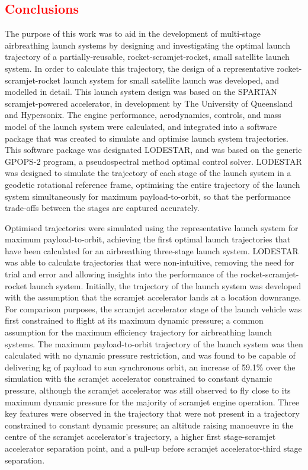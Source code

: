 
\cleardoublepage
\textcolor{red}{
\chapter{Conclusions}
}
\noindent
The purpose of this work was to aid in the development of multi-stage airbreathing launch systems by designing and investigating the optimal launch trajectory of a partially-reusable, rocket-scramjet-rocket, small satellite launch system. 
In order to calculate this trajectory, the design of a representative rocket-scramjet-rocket launch system for small satellite launch was developed, and modelled in detail. This launch system design was based on the SPARTAN scramjet-powered accelerator, in development by The University of Queensland and Hypersonix. The engine performance, aerodynamics, controls, and mass model of the launch system were calculated, and integrated into a software package that was created to simulate and optimise launch system trajectories. This software package was designated LODESTAR, and was based on the generic GPOPS-2 program, a pseudospectral method optimal control solver. LODESTAR was designed to simulate the trajectory of each stage of the launch system in a geodetic rotational reference frame, optimising the entire trajectory of the launch system simultaneously for maximum payload-to-orbit, so that the performance trade-offs between the stages are captured accurately.

Optimised trajectories were simulated using the representative launch system for maximum payload-to-orbit, achieving the first optimal launch trajectories that have been calculated for an airbreathing three-stage launch system. LODESTAR was able to calculate trajectories that were non-intuitive, removing the need for trial and error and allowing insights into the performance of the rocket-scramjet-rocket launch system. 
Initially, the trajectory of the launch system was developed with the assumption that the scramjet accelerator lands at a location downrange.
For comparison purposes, the scramjet accelerator stage of the launch vehicle was first constrained to flight at its maximum dynamic pressure;  a common assumption for the maximum efficiency trajectory for airbreathing launch systems.
The maximum payload-to-orbit trajectory of the launch system was then calculated with no dynamic pressure restriction, and was found to be capable of delivering \PayloadToOrbitStandardNoReturn kg of payload to sun synchronous orbit, an increase of 59.1\% over the simulation with the scramjet accelerator constrained to constant dynamic pressure, although the scramjet accelerator was still observed to fly close to its maximum dynamic pressure for the majority of scramjet engine operation. 
Three key features were observed in the trajectory that were not present in a trajectory constrained to constant dynamic pressure; an altitude raising manoeuvre in the centre of the scramjet accelerator's trajectory, a higher first stage-scramjet accelerator separation point, and a pull-up before scramjet accelerator-third stage separation.


